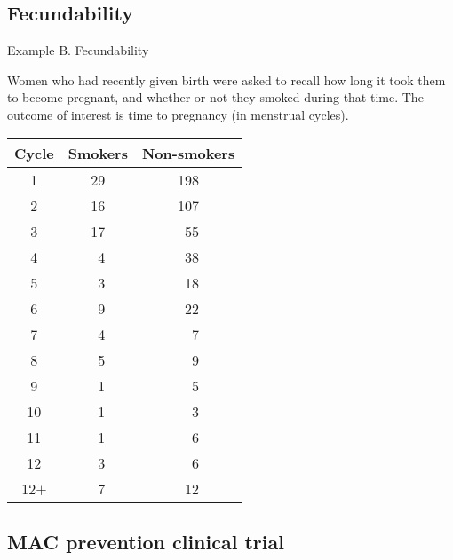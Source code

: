 \documentclass[envcountsect, 10pt, portrait, palatino]{beamer}
\begin{document}
\subsection{Fecundability}
\begin{frame}{Example B. Fecundability}

Women who had recently given birth were asked to
recall how long it took them to become pregnant, and whether
or not they smoked during that time.
The outcome of interest is time
to pregnancy (in menstrual cycles).
\scriptsize
\begin{center}
\begin{tabular}{ccc}
Cycle& Smokers & Non-smokers \\ \hline
1    &  29  &     198 \\
2    &  16  &     107 \\
3    &  17  &     ~55 \\
4    &  ~4  &     ~38 \\
5    &  ~3  &     ~18 \\
6    &  ~9  &     ~22 \\
7    &  ~4  &     ~~7 \\
8    &  ~5  &     ~~9 \\
9    &  ~1  &     ~~5 \\
10   &  ~1  &     ~~3 \\
11   &  ~1  &     ~~6 \\
12   &  ~3  &     ~~6 \\
12$+$&  ~7  &     ~12 \\ \hline
 \end{tabular}
 \end{center}
\normalsize
\end{frame}
\subsection{MAC prevention clinical trial}
\end{document}
